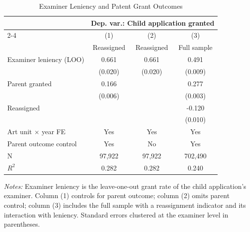 \begin{table}[t]
\centering
\caption{Examiner Leniency and Patent Grant Outcomes}
\label{tab:main}
\begin{tabular}{lccc}
\hline\hline
 & \multicolumn{3}{c}{Dep. var.: Child application granted} \\
\cmidrule(lr){2-4}
 & (1) & (2) & (3) \\
 & Reassigned & Reassigned & Full sample \\
\hline
Examiner leniency (LOO) & 0.661 & 0.661 & 0.491 \\
 & (0.020) & (0.020) & (0.009) \\
Parent granted & 0.166 & & 0.277 \\
 & (0.006) & & (0.003) \\
Reassigned & & & -0.120 \\
 & & & (0.010) \\
\hline
Art unit $\times$ year FE & Yes & Yes & Yes \\
Parent outcome control & Yes & No & Yes \\
N & 97,922 & 97,922 & 702,490 \\
$R^2$ & 0.282 & 0.282 & 0.240 \\
\hline\hline
\end{tabular}
\begin{tablenotes}[flushleft]
\small
\item \textit{Notes:} Examiner leniency is the leave-one-out grant rate of the child application's examiner. Column (1) controls for parent outcome; column (2) omits parent control; column (3) includes the full sample with a reassignment indicator and its interaction with leniency. Standard errors clustered at the examiner level in parentheses.
\end{tablenotes}
\end{table}
